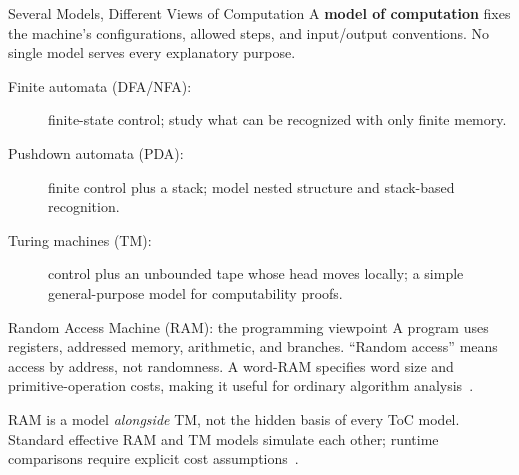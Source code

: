 \documentclass[10pt]{beamer}
\begin{document}
\begin{frame}{Several Models, Different Views of Computation}
  \small
  A \textbf{model of computation} fixes the machine's configurations,
  allowed steps, and input/output conventions. No single model serves
  every explanatory purpose.
  \begin{description}
    \item[Finite automata (DFA/NFA):] finite-state control; study what can
      be recognized with only finite memory.
    \item[Pushdown automata (PDA):] finite control plus a stack; model
      nested structure and stack-based recognition.
    \item[Turing machines (TM):] control plus an unbounded tape whose head
      moves locally; a simple general-purpose model for computability proofs.
  \end{description}
  \pause
  \begin{block}{Random Access Machine (RAM): the programming viewpoint}
    A program uses registers, addressed memory, arithmetic, and branches.
    ``Random access'' means access by address, not randomness. A word-RAM
    specifies word size and primitive-operation costs, making it useful for
    ordinary algorithm analysis~\cite{wordram}.
  \end{block}
  \pause
  RAM is a model \emph{alongside} TM, not the hidden basis of every ToC
  model. Standard effective RAM and TM models simulate each other;
  runtime comparisons require explicit cost assumptions~\cite{model-simulation}.
\end{frame}
\end{document}

